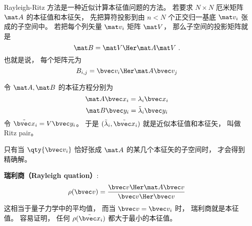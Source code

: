 
\begin{issues}
\issueDraft
\end{issues}


Rayleigh-Ritz 方法是一种近似计算本征值问题的方法。 若要求 $N\times N$ 厄米矩阵 $\mat A$ 的本征值和本征矢， 先把算符投影到由 $n < N$ 个正交归一基底 $\mat v_i$ 张成的子空间中。 若把每个列矢量 $\mat v_i$ 矩阵 $\mat V$， 那么子空间的投影矩阵就是
\begin{equation}
\mat B = \mat V\Her \mat A \mat V~.
\end{equation}
也就是说， 每个矩阵元为
\begin{equation}
B_{i,j} = \bvec v_i\Her \mat A \bvec v_j
\end{equation}

令 $\mat A, \mat B$ 的本征方程分别为
\begin{equation}
\mat A \bvec x_i = \lambda_i \bvec x_i
\end{equation}
\begin{equation}
\mat B \bvec y_i = \tilde\lambda_i \bvec y_i
\end{equation}
令 $\tilde{\bvec x}_i = V \bvec y_i$。 于是 $(\tilde\lambda_i, \tilde{\bvec x}_i)$ 就是近似本征值和本征矢， 叫做 Ritz pair。

只有当 $\qty{\bvec v_i}$ 恰好张成 $\mat A$ 的某几个本征矢的子空间时， 才会得到精确解。

\textbf{瑞利商（Rayleigh quation）}:
\begin{equation}
\rho(\bvec v) = \frac{\bvec v\Her \mat A \bvec v}{\bvec v\Her \bvec v}
\end{equation}
这相当于量子力学中的平均值， 而当 $\bvec v = \bvec v_i$ 时， 瑞利商就是本征值。 容易证明， 任何 $\rho(\tilde {\bvec x}_i)$ 都大于最小的本征值。
